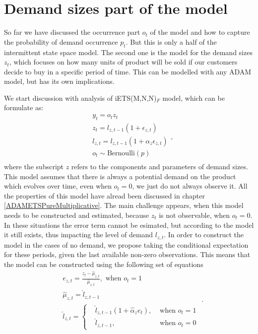 \documentclass[
]{book}
\theoremstyle{definition}
\theoremstyle{definition}
\theoremstyle{definition}
\theoremstyle{definition}
\theoremstyle{remark}
\begin{document}
\hypertarget{ADAMDemandSizes}{%
\section{Demand sizes part of the model}\label{ADAMDemandSizes}}

So far we have discussed the occurrence part \(o_t\) of the model and how to capture the probability of demand occurrence \(p_t\). But this is only a half of the intermittent state space model. The second one is the model for the demand sizes \(z_t\), which focuses on how many units of product will be sold if our customers decide to buy in a specific period of time. This can be modelled with any ADAM model, but has its own implications.

We start discussion with analysis of iETS(M,N,N)\(_F\) model, which can be formulate as:
\begin{equation}
    \begin{aligned}
        & y_t = o_t z_t  \\
        & z_t = l_{z,t-1}(1 + \epsilon_{z,t}) \\
        & l_{z,t} = l_{z,t-1}(1  + \alpha_{z} \epsilon_{z,t}) \\
        & o_t \sim \text{Bernoulli}(p) \\
    \end{aligned},
    \label{eq:iETSMNNFixed}
\end{equation}
where the subscript \(z\) refers to the components and parameters of demand sizes. This model assumes that there is always a potential demand on the product which evolves over time, even when \(o_t=0\), we just do not always observe it. All the properties of this model have alread been discussed in chapter \ref{ADAMETSPureMultiplicative}. The main challenge appears, when this model needs to be constructed and estimated, because \(z_t\) is not observable, when \(o_t=0\). In these situations the error term cannot be esimated, but according to the model it still exists, thus impacting the level of demand \(l_{z,t}\). In order to construct the model in the cases of no demand, we propose taking the conditional expectation for these periods, given the last available non-zero observations. This means that the model can be constructed using the following set of equations
\begin{equation}
    \begin{aligned}
        & e_{z,t} = \frac{z_t - \hat{\mu}_{z,t}}{\hat{\mu}_{z,t}}, \text{ when } o_t=1 \\
        & \hat{\mu}_{z,t} = \hat{l}_{z,t-1} \\
        & \hat{l}_{z,t} = 
        \left \lbrace \begin{aligned}
                  & \hat{l}_{z,t-1} (1 + \hat{\alpha}_z e_t ), & \text{ when } o_t=1 \\
                  & \hat{l}_{z,t-1} , & \text{ when } o_t=0
            \end{aligned} \right.
    \end{aligned}.
    \label{eq:iETSMNNFixedConstruction}
\end{equation}
\end{document}
